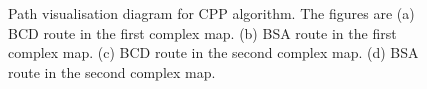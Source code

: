 \documentclass[conference]{IEEEtran}
\begin{document}
\begin{figure}[bp]
\centering
{}\hspace{-15mm}
\quad
{}\hspace{-15mm}
\quad
{}\hspace{-15mm}
\quad
{}
\caption{Path visualisation diagram for CPP algorithm. The figures are  (a) BCD route in the first complex map. (b) BSA route in the first complex map. (c) BCD route in the second complex map. (d) BSA route in the second complex map.}
\label{fig7}
\end{figure}
\end{document}
